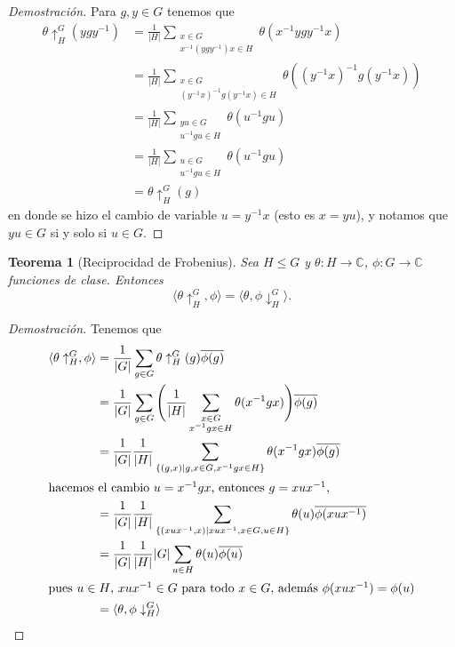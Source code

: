 \documentclass[12pt]{book}
\newtheorem{theorem}{Teorema}[section]
\theoremstyle{definition}
\newcounter{in}
\begin{document}
\begin{proof}[Demostración]
  Para $g,y\in G$ tenemos que
  \begin{align*}
    \theta\uparrow^{G}_{H}(ygy^{-1})&=\frac{1}{|H|}\sum_{\substack{x\in
        G\\x^{-1}(ygy^{-1})x\in H}}\theta(x^{-1}ygy^{-1}x)\\
    &=\frac{1}{|H|}\sum_{\substack{x\in
        G\\(y^{-1}x)^{-1}g(y^{-1}x)\in H}}\theta((y^{-1}x)^{-1}g(y^{-1}x))\\
    &=\frac{1}{|H|}\sum_{\substack{yu\in
        G\\u^{-1}gu\in H}}\theta(u^{-1}gu)\\
     &=\frac{1}{|H|}\sum_{\substack{u\in
        G\\u^{-1}gu\in H}}\theta(u^{-1}gu)\\
    &=\theta\uparrow^{G}_{H}(g)
  \end{align*}
en donde se hizo el cambio de variable $u=y^{-1}x$ (esto es $x=yu$), y notamos
que $yu\in G$ si y solo si $u\in G$.
\end{proof}
\begin{theorem}[Reciprocidad de Frobenius]
  \label{frobenius}
  Sea $H\leq G$ y $\theta:H\rightarrow\mathbb{C}$,
  $\phi:G\rightarrow \mathbb{C}$ funciones de
  clase. Entonces
  \begin{equation*}
    \langle\theta\uparrow^{G}_{H},\phi\rangle=\langle\theta,\phi\downarrow^{G}_{H}\rangle.
  \end{equation*}
\end{theorem}
\begin{proof}[Demostración]
  Tenemos que 
  \begin{align*}
    \langle\theta\uparrow^{G}_{H},\phi\rangle&=\frac{1}{|G|}\sum_{g\in
      G}\theta\uparrow^{G}_{H}(g)\overline{\phi(g)}\\
    &=\frac{1}{|G|}\sum_{g\in G}\Bigg(\frac{1}{|H|}\sum_{\substack{x\in
        G\\x^{-1}gx\in H}}\theta(x^{-1}gx)\Bigg)\overline{\phi(g)}\\
    &=\frac{1}{|G|}\frac{1}{|H|}\sum_{\{(g,x)\mid g,x\in G,x^{-1}gx\in
      H\}}\theta(x^{-1}gx)\overline{\phi(g)}\\
    \intertext{hacemos el cambio $u=x^{-1}gx$, entonces $g=xux^{-1}$,}
    &=\frac{1}{|G|}\frac{1}{|H|}\sum_{\{(xux^{-1},x)\mid xux^{-1},x\in G,u\in H\}}\theta(u)\overline{\phi(xux^{-1})}\\
    &=\frac{1}{|G|}\frac{1}{|H|}|G|\sum_{u\in
      H}\theta(u)\overline{\phi(u)}\\
    \intertext{pues $u\in H$, $xux^{-1}\in G$ para todo $x\in G$,
      además $\phi(xux^{-1})=\phi(u)$}
    &=\langle\theta,\phi\downarrow^{G}_{H}\rangle
 \end{align*} 
\end{proof}
\end{document}
